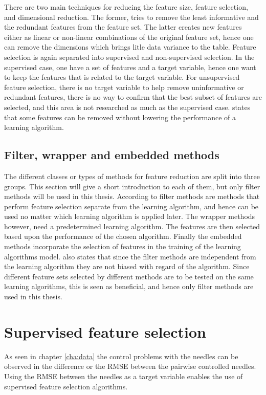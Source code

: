     
    There are two main techniques for reducing the feature size, feature selection, and dimensional reduction. The former, tries to remove the least informative and the redundant features from the feature set. The latter creates new features either as linear or non-linear combinations of the original feature set, hence one can remove the dimensions which brings litle data variance to the table. Feature selection is again separated into supervised and non-supervised selection. In the supervised case, one have a set of features and a target variable, hence one want to keep the features that is related to the target variable. For unsupervised feature selection, there is no target variable to help remove uninformative or redundant features, there is no way to confirm that the best subset of features are selected, and this area is not researched as much as the supervised case. \cite{Liu2010} states that some features can be removed without lowering the performance of a learning algorithm. 
    
    \subsection{Filter, wrapper and embedded methods}\label{subsec:filter_wrapper_embedded}
    The different classes or types of methods for feature reduction are split into three groups. This section will give a short introduction to each of them, but only filter methods will be used in this thesis.
    According to \cite{Liu2010} filter methods are methods that perform feature selection separate from the learning algorithm, and hence can be used no matter which learning algorithm is applied later. The wrapper methods however, need a predetermined learning algorithm. The features are then selected based upon the performance of the chosen algorithm.  Finally the embedded methods incorporate the selection of features in the training of the learning algorithms model.
    \cite{Liu2010} also states that since the filter methods are independent from the learning algorithm they are not biased with regard of the algorithm. Since different feature sets selected by different methods are to be tested on the same learning algorithms, this is seen as beneficial, and hence only filter methods are used in this thesis. 

\section{Supervised feature selection}\label{sec:sup_feat_select}
    As seen in chapter \ref{cha:data} the control problems with the needles can be observed in the difference or the RMSE between the pairwise controlled needles. Using the RMSE between the needles as a target variable enables the use of supervised feature selection algorithms. 
    
